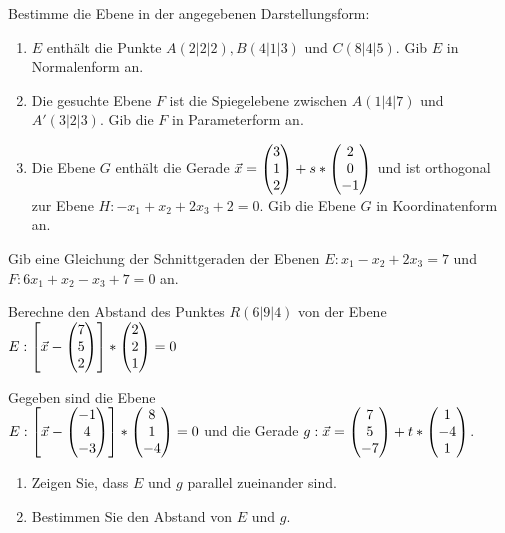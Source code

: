 






Bestimme die Ebene in der angegebenen Darstellungsform:
\begin{enumerate}
	\item $E$ enthält die Punkte $A(2|2|2), B(4|1|3)$ und $C(8|4|5)$. Gib $E$ in Normalenform an. %
	\item Die gesuchte Ebene $F$ ist die Spiegelebene zwischen $A(1|4|7)$ und $A'(3|2|3)$. Gib die $F$ in Parameterform an. %
	\item Die Ebene $G$ enthält die Gerade $\vec x = \begin{pmatrix} 3\\1\\2 \end{pmatrix}+s*\begin{pmatrix} 2\\0\\-1 \end{pmatrix}$ und ist orthogonal zur Ebene $H:-x_1+x_2+2x_3+2=0$. Gib die Ebene $G$ in Koordinatenform an. %
\end{enumerate}

Gib eine Gleichung der Schnittgeraden der Ebenen $E: x_1-x_2+2x_3=7$ und $F:6x_1+x_2-x_3+7=0$ an.

Berechne den Abstand des Punktes $R(6|9|4)$ von der Ebene $E: \left[ \vec x -  \begin{pmatrix} 7 \\ 5\\ 2 \end{pmatrix}\right]*\begin{pmatrix} 2\\ 2 \\1 \end{pmatrix}=0$



Gegeben sind die Ebene \\$E: \left[ \vec x -  \begin{pmatrix} -1 \\ 4\\ -3 \end{pmatrix}\right]*\begin{pmatrix} 8\\ 1 \\-4 \end{pmatrix}=0$ und die Gerade $g: \vec x=\begin{pmatrix} 7\\5\\-7 \end{pmatrix}+t*\begin{pmatrix} 1\\-4\\1 \end{pmatrix}$.
\begin{enumerate}
	\item Zeigen Sie, dass $E$ und $g$ parallel zueinander sind.
	\item Bestimmen Sie den Abstand von $E$ und $g$.
\end{enumerate}

